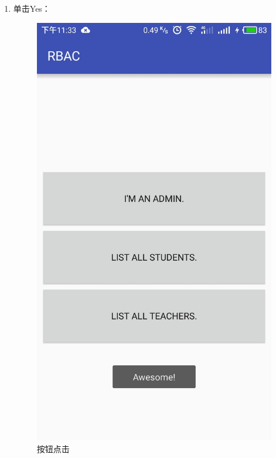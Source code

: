 \begin{itemize}
\begin{enumerate}
\begin{itemize}
\begin{enumerate}
				\item 单击Yes：
				\begin{figure}[H]
					\centering
					\includegraphics[height=0.39\textheight]{snapshot/16}
					\caption{按钮点击}
					\label{fig:16}
				\end{figure}
			

\end{enumerate}
\end{itemize}
\end{enumerate}
\end{itemize}
